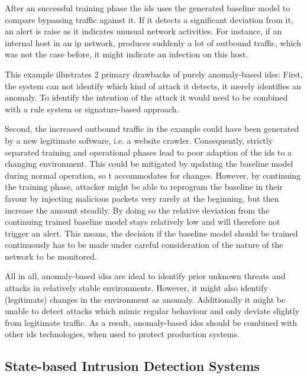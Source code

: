 After an successful training phase the \gls{ids} uses the generated baseline model to compare bypassing traffic against it.
If it detects a significant deviation from it, an alert is raise as it indicates unusual network activities.
For instance, if an internal host in an \gls{ip} network, produces suddenly a lot of outbound traffic, which was not the case before, it might indicate an infection on this host.

This example illustrates 2 primary drawbacks of purely anomaly-based \glspl{ids}: 
First, the system can not identify which kind of attack it detects, it merely identifies an anomaly. To identify the intention of the attack it would need to be combined with a rule system or signature-based approach.

Second, the increased outbound traffic in the example could have been generated by a new legitimate software, i.e. a website crawler.
Consequently, strictly separated training and operational phases lead to poor adaption of the \gls{ids} to a changing environment.
This could be mitigated by updating the baseline model during normal operation, so t accommodates for changes.
However, by continuing the training phase, attacker might be able to reprogram the baseline in their favour by injecting malicious packets very rarely at the beginning, but then increase the amount steadily.
By doing so the relative deviation from the continuing trained baseline model stays relatively low and will therefore not trigger an alert.
This means, the decision if the baseline model should be trained continuously has to be made under careful consideration of the nature of the network to be monitored.

All in all, anomaly-based \glspl{ids} are ideal to identify prior unknown threats and attacks in relatively stable environments. However, it might also identify (legitimate) changes in the environment as anomaly. Additionally it might be unable to detect attacks which mimic regular behaviour and only deviate slightly from legitimate traffic.
As a result, anomaly-based \glspl{ids} should be combined with other \gls{ids} technologies, when used to protect production systems.
\parencite[cf.][pp.~203-204]{Northcutt2005} 
	
	\subsection{State-based Intrusion Detection Systems}
	\label{sec:background:network:ids:state}
	
